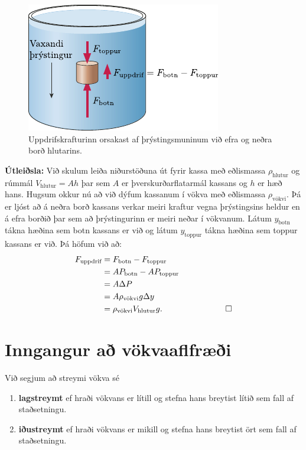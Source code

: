 \begin{minipage}{\linewidth}
\begin{figure}
    \centering
    \includegraphics{figures/uppdrif.pdf}
    \caption{Uppdrifskrafturinn orsakast af þrýstingsmuninum við efra og neðra borð hlutarins.}
    \label{fig:uppdrif}
\end{figure}

\textbf{Útleiðsla:} Við skulum leiða niðurstöðuna út fyrir kassa með eðlismassa $\rho_{\text{hlutur}}$ og rúmmál $V_{\text{hlutur}} = Ah$ þar sem $A$ er þverskurðarflatarmál kassans og $h$ er hæð hans. Hugsum okkur nú að við dýfum kassanum í vökva með eðlismassa $\rho_{\text{vökvi}}$. Þá er ljóst að á neðra borð kassans verkar meiri kraftur vegna þrýstingsins heldur en á efra borðið þar sem að þrýstingurinn er meiri neðar í vökvanum. Látum $y_{\text{botn}}$ tákna hæðina sem botn kassans er við og látum $y_{\text{toppur}}$ tákna hæðina sem toppur kassans er við. Þá höfum við að:
\begin{align*}
    F_{\text{uppdrif}} &= F_{\text{botn}} - F_{\text{toppur}} \\
    &= AP_{\text{botn}} - AP_{\text{toppur}} \\
    &= A \Delta P \\
    &= A \rho_{\text{vökvi}}g\Delta y \\
    &= \rho_{\text{vökvi}}V_{\text{hlutur}}g. \hspace{2cm} \qed
\end{align*}
\end{minipage}


\section{Inngangur að vökvaaflfræði}

\begin{tcolorbox}
\begin{definition}
Við segjum að streymi vökva sé
\begin{enumerate}[label = \textbf{(\roman*)}]
    \item \textbf{lagstreymt} ef hraði vökvans er lítill og stefna hans breytist lítið sem fall af staðsetningu.
    \item \textbf{iðustreymt} ef hraði vökvans er mikill og stefna hans breytist ört sem fall af staðsetningu.
\end{enumerate}
\end{definition}
\end{tcolorbox}




